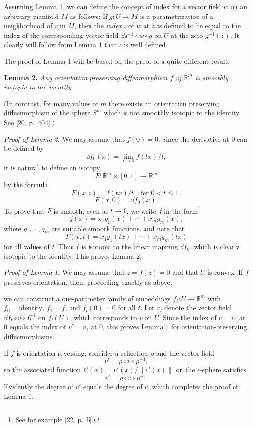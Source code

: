 
Assuming Lemma 1, we can define the concept of index for a vector field $w$ on an arbitrary manifold $M$ as follows: If $g : U \to M$ is a parametrization of a neighborhood of $z$ in $M$, then the \emph{index} $\iota$ of $w$ at $z$ is defined to be equal to the index of the corresponding vector field $\dd g^{-1} \circ w \circ g$ on $U$ at the zero $g^{-1}(z)$. It clearly will follow from Lemma 1 that $\iota$ is well defined.

The proof of Lemma 1 will be based on the proof of a quite different result:

\noindent\textbf{Lemma 2.} \textit{Any orientation preserving diffeomorphism $f$ of $\mathbb{R}^m$ is smoothly isotopic to the identity.}

(In contrast, for many values of $m$ there exists an orientation preserving diffeomorphism of the sphere $S^m$ which is not smoothly isotopic to the identity. See [20, p.~404].)

\noindent\textit{Proof of Lemma 2.}
We may assume that $f(0) = 0$. Since the derivative at $0$ can be defined by
\[
\dd f_0(x) = \lim_{t \to 0} f(tx)/t,
\]
it is natural to define an isotopy
\[
F : \mathbb{R}^m \times [0, 1] \to \mathbb{R}^m
\]
by the formula
\[
F(x, t) = f(tx)/t \quad \text{for } 0 < t \leq 1,
\]
\[
F(x, 0) = \dd f_0(x).
\]
To prove that $F$ is smooth, even as $t \to 0$, we write $f$ in the form\footnote{See for example [22, p.~5].}
\[
f(x) = x_1 g_1(x) + \cdots + x_m g_m(x),
\]
where $g_1, \ldots, g_m$ are suitable smooth functions, and note that
\[
F(x, t) = x_1 g_1(tx) + \cdots + x_m g_m(tx)
\]
for all values of $t$. Thus $f$ is isotopic to the linear mapping $\dd f_0$, which is clearly isotopic to the identity. This proves Lemma 2.

\noindent\textit{Proof of Lemma 1.}
We may assume that $z = f(z) = 0$ and that $U$ is convex. If $f$ preserves orientation, then, proceeding exactly as above,



we can construct a one-parameter family of embeddings $f_t : U \to \mathbb{R}^m$ with $f_0 = \text{identity}$, $f_1 = f$, and $f_t(0) = 0$ for all $t$. Let $v_t$ denote the vector field $\dd f_t \circ v \circ f_t^{-1}$ on $f_t(U)$, which corresponds to $v$ on $U$. Since the index of $v = v_0$ at $0$ equals the index of $v' = v_1$ at $0$, this proves Lemma 1 for orientation-preserving diffeomorphisms.

If $f$ is orientation-reversing, consider a reflection $\rho$ and the vector field
\[
v' = \rho \circ v \circ \rho^{-1},
\]
so the associated function $\bar{v}'(x) = v'(x) / \|v'(x)\|$ on the $\epsilon$-sphere satisfies
\[
\bar{v}' = \rho \circ \bar{v} \circ \rho^{-1}.
\]
Evidently the degree of $\bar{v}'$ equals the degree of $\bar{v}$, which completes the proof of Lemma 1.

